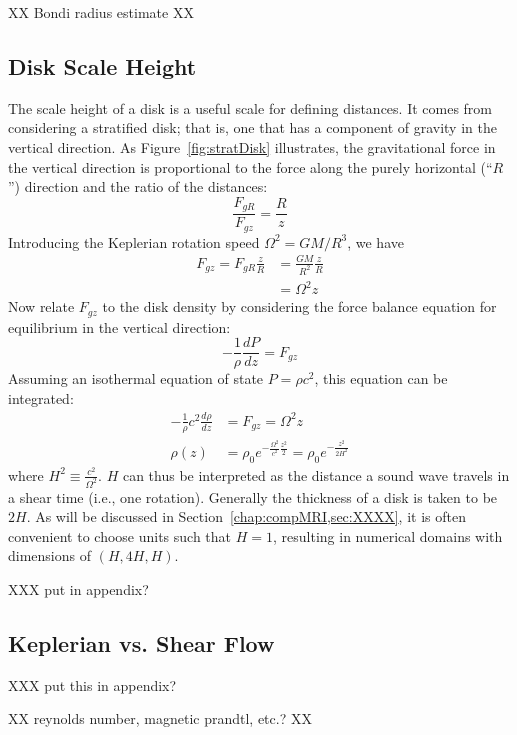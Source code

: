 XX Bondi radius estimate XX

\subsection{Disk Scale Height}\label{ssec:scaleheight}
The scale height of a disk is a useful scale for defining distances. It comes from considering a stratified disk; that is, one that has a component of gravity in the vertical direction. As Figure~\ref{fig:stratDisk} illustrates, the gravitational force in the vertical direction is proportional to the force along the purely horizontal (``$R$'') direction and the ratio of the distances:
\begin{equation}
\frac{F_{gR}}{F_{gz}}=\frac{R}{z}
\end{equation}
Introducing the Keplerian rotation speed $\Omega^2=GM/R^3$, we have  
\begin{align*}
F_{gz}=F_{gR}\frac z R&=\frac{GM}{R^2}\frac zR\\
&=\Omega^2 z
\end{align*}
Now relate $F_{gz}$ to the disk density by considering the force balance equation for equilibrium in the vertical direction:
\begin{equation*}
-\frac1\rho\frac{dP}{dz}=F_{gz}
\end{equation*}
Assuming an isothermal equation of state $P=\rho c^2$, this equation can be integrated:
\begin{align*}
-\frac1\rho c^2\frac{d\rho}{dz}&=F_{gz}=\Omega^2z\\
\rho(z)&=\rho_0 e^{-\frac{\Omega^2}{c^2}\frac{z^2}2}=\rho_0e^{-\frac{z^2}{2H^2}}
\end{align*}
where $H^2\equiv\frac{c^2}{\Omega^2}$. $H$ can thus be interpreted as the distance a sound wave travels in a shear time (i.e., one rotation). Generally the thickness of a disk is taken to be $2H$. As will be discussed in Section~\ref{chap:compMRI,sec:XXXX}, it is often convenient to choose units such that $H=1$, resulting in numerical domains with dimensions of $(H,4H,H)$. 


XXX put in appendix?
\subsection{Keplerian vs. Shear Flow}
XXX put this in appendix? 


XX reynolds number, magnetic prandtl, etc.? XX


